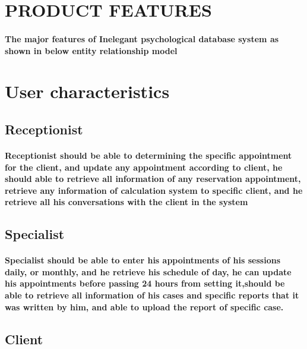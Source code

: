 \documentclass[../Psychological_system_web_application.tex]{subfiles}
\begin{document}
		\section{PRODUCT FEATURES}
			
			\paragraph{  The major features of Inelegant psychological \gls{database} system as shown in below \gls{entity relationship model}}
				
		
		\section{User characteristics}
			\subsection{Receptionist}			
			\paragraph{Receptionist should be able to determining the specific appointment for the client, and update any appointment according to client, he should able to retrieve all information of any reservation appointment, retrieve any information of calculation system to specific client, and he retrieve all his conversations with the client in the system}
			
			\subsection{Specialist}
			\paragraph{Specialist should be able to enter his appointments of his sessions daily, or monthly, and he retrieve his schedule of day, he can update his appointments before passing 24 hours from setting it,should be able to retrieve all information of his cases and specific reports that it was written by him, and able to upload the report of specific case.}
			
			\subsection{Client}
\end{document}
